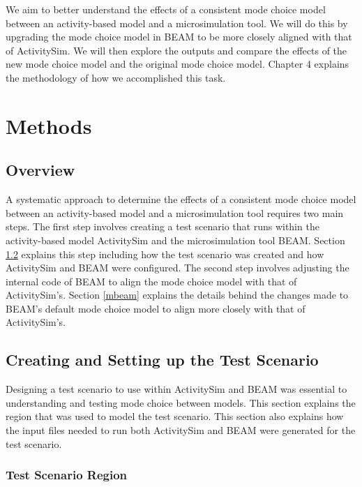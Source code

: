\documentclass[12pt, oneside, openright]{byuthesis}
\begin{document}
We aim to better understand the effects of a consistent mode choice model between an activity-based model and a microsimulation tool. We will do this by upgrading the mode choice model in BEAM to be more closely aligned with that of ActivitySim. We will then explore the outputs and compare the effects of the new mode choice model and the original mode choice model. Chapter 4 explains the methodology of how we accomplished this task.

\hypertarget{methods}{%
\chapter{Methods}\label{methods}}

\hypertarget{overview-1}{%
\section{Overview}\label{overview-1}}

A systematic approach to determine the effects of a consistent mode choice model between an activity-based model and a microsimulation tool requires two main steps. The first step involves creating a test scenario that runs within the activity-based model ActivitySim and the microsimulation tool BEAM. Section \ref{mscen} explains this step including how the test scenario was created and how ActivitySim and BEAM were configured. The second step involves adjusting the internal code of BEAM to align the mode choice model with that of ActivitySim's. Section \ref{mbeam} explains the details behind the changes made to BEAM's default mode choice model to align more closely with that of ActivitySim's.

\hypertarget{mscen}{%
\section{Creating and Setting up the Test Scenario}\label{mscen}}

Designing a test scenario to use within ActivitySim and BEAM was essential to understanding and testing mode choice between models. This section explains the region that was used to model the test scenario. This section also explains how the input files needed to run both ActivitySim and BEAM were generated for the test scenario.

\hypertarget{test-scenario-region}{%
\subsection{Test Scenario Region}\label{test-scenario-region}}
\end{document}
